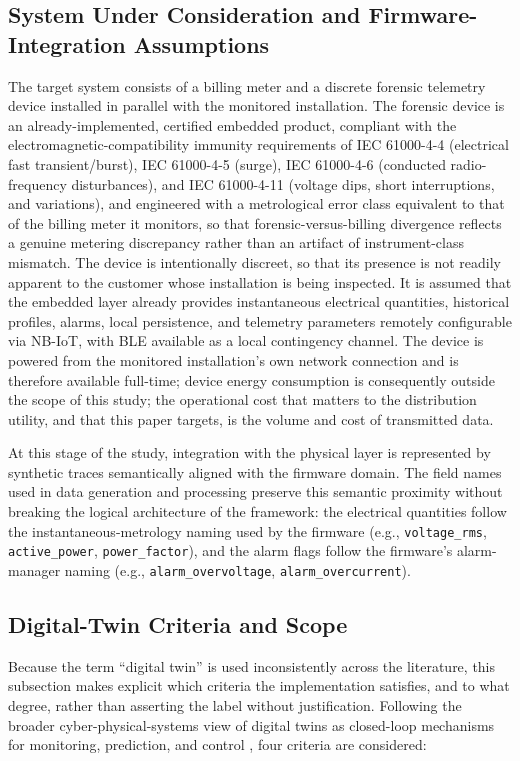 \documentclass{ieeeaccess}
\begin{document}
\subsection{System Under Consideration and Firmware-Integration Assumptions}
The target system consists of a billing meter and a discrete forensic telemetry device installed in parallel with the monitored installation. The forensic device is an already-implemented, certified embedded product, compliant with the electromagnetic-compatibility immunity requirements of IEC 61000-4-4 (electrical fast transient/burst), IEC 61000-4-5 (surge), IEC 61000-4-6 (conducted radio-frequency disturbances), and IEC 61000-4-11 (voltage dips, short interruptions, and variations), and engineered with a metrological error class equivalent to that of the billing meter it monitors, so that forensic-versus-billing divergence reflects a genuine metering discrepancy rather than an artifact of instrument-class mismatch. The device is intentionally discreet, so that its presence is not readily apparent to the customer whose installation is being inspected. It is assumed that the embedded layer already provides instantaneous electrical quantities, historical profiles, alarms, local persistence, and telemetry parameters remotely configurable via NB-IoT, with BLE available as a local contingency channel. The device is powered from the monitored installation's own network connection and is therefore available full-time; device energy consumption is consequently outside the scope of this study; the operational cost that matters to the distribution utility, and that this paper targets, is the volume and cost of transmitted data.

At this stage of the study, integration with the physical layer is represented by synthetic traces semantically aligned with the firmware domain. The field names used in data generation and processing preserve this semantic proximity without breaking the logical architecture of the framework: the electrical quantities follow the instantaneous-metrology naming used by the firmware (e.g., \texttt{voltage\_rms}, \texttt{active\_power}, \texttt{power\_factor}), and the alarm flags follow the firmware's alarm-manager naming (e.g., \texttt{alarm\_overvoltage}, \texttt{alarm\_overcurrent}).

\subsection{Digital-Twin Criteria and Scope}
\label{subsec:twin_criteria}
Because the term ``digital twin'' is used inconsistently across the literature, this subsection makes explicit which criteria the implementation satisfies, and to what degree, rather than asserting the label without justification. Following the broader cyber-physical-systems view of digital twins as closed-loop mechanisms for monitoring, prediction, and control \cite{b15,b16,b24}, four criteria are considered:
\end{document}
